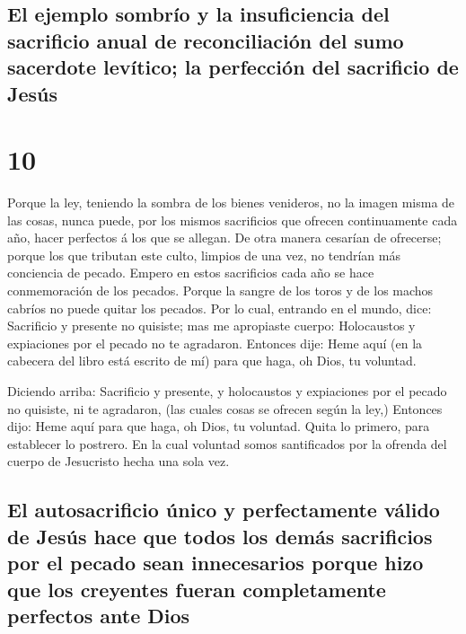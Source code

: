 \hypertarget{el-ejemplo-sombruxedo-y-la-insuficiencia-del-sacrificio-anual-de-reconciliaciuxf3n-del-sumo-sacerdote-levuxedtico-la-perfecciuxf3n-del-sacrificio-de-jesuxfas}{%
\subsection{El ejemplo sombrío y la insuficiencia del sacrificio anual
de reconciliación del sumo sacerdote levítico; la perfección del
sacrificio de
Jesús}\label{el-ejemplo-sombruxedo-y-la-insuficiencia-del-sacrificio-anual-de-reconciliaciuxf3n-del-sumo-sacerdote-levuxedtico-la-perfecciuxf3n-del-sacrificio-de-jesuxfas}}

\hypertarget{section-9}{%
\section{10}\label{section-9}}

 Porque la ley, teniendo la sombra de los bienes venideros,
no la imagen misma de las cosas, nunca puede, por los mismos sacrificios
que ofrecen continuamente cada año, hacer perfectos á los que se
allegan.  De otra manera cesarían de ofrecerse; porque los
que tributan este culto, limpios de una vez, no tendrían más conciencia
de pecado.  Empero en estos sacrificios cada año se hace
conmemoración de los pecados.  Porque la sangre de los toros
y de los machos cabríos no puede quitar los pecados.  Por lo
cual, entrando en el mundo, dice: Sacrificio y presente no quisiste; mas
me apropiaste cuerpo:  Holocaustos y expiaciones por el
pecado no te agradaron.  Entonces dije: Heme aquí (en la
cabecera del libro está escrito de mí) para que haga, oh Dios, tu
voluntad.

 Diciendo arriba: Sacrificio y presente, y holocaustos y
expiaciones por el pecado no quisiste, ni te agradaron, (las cuales
cosas se ofrecen según la ley,)  Entonces dijo: Heme aquí
para que haga, oh Dios, tu voluntad. Quita lo primero, para establecer
lo postrero.  En la cual voluntad somos santificados por la
ofrenda del cuerpo de Jesucristo hecha una sola vez.

\hypertarget{el-autosacrificio-uxfanico-y-perfectamente-vuxe1lido-de-jesuxfas-hace-que-todos-los-demuxe1s-sacrificios-por-el-pecado-sean-innecesarios-porque-hizo-que-los-creyentes-fueran-completamente-perfectos-ante-dios}{%
\subsection{El autosacrificio único y perfectamente válido de Jesús hace
que todos los demás sacrificios por el pecado sean innecesarios porque
hizo que los creyentes fueran completamente perfectos ante
Dios}\label{el-autosacrificio-uxfanico-y-perfectamente-vuxe1lido-de-jesuxfas-hace-que-todos-los-demuxe1s-sacrificios-por-el-pecado-sean-innecesarios-porque-hizo-que-los-creyentes-fueran-completamente-perfectos-ante-dios}}

